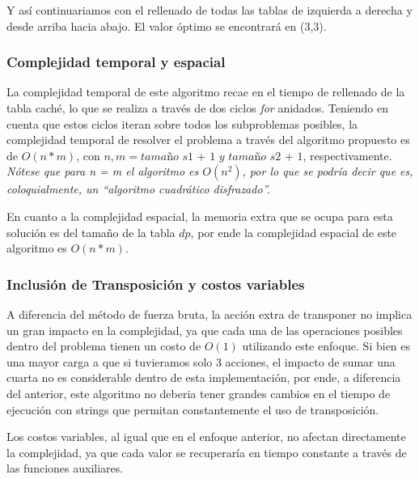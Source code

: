 Y así continuariamos con el rellenado de todas las tablas de izquierda a derecha y desde arriba hacia abajo. 
El valor óptimo se encontrará en (3,3).


\subsubsection{Complejidad temporal y espacial}
La complejidad temporal de este algoritmo recae en el tiempo de rellenado de la tabla caché, lo que se realiza a través de dos ciclos \textit{for} anidados.
Teniendo en cuenta que estos ciclos iteran sobre todos los subproblemas posibles, la complejidad temporal de resolver el problema 
a través del algoritmo propuesto es de $O(n*m)$, con $n,m = \textit{tamaño s1 + 1 y tamaño s2 + 1}$, respectivamente. 
\textit{Nótese que para n = m el algoritmo es $O(n^2)$, por lo que se podría decir que es, coloquialmente, un ``algoritmo cuadrático disfrazado''.}   

En cuanto a la complejidad espacial, la memoria extra que se ocupa para esta solución es del tamaño de la tabla $dp$, por ende la complejidad espacial de este algoritmo
es $O(n*m)$.


\subsubsection{Inclusión de Transposición y costos variables}
A diferencia del método de fuerza bruta, la acción extra de transponer no implica un gran impacto en la complejidad, ya que cada una de las operaciones posibles 
dentro del problema tienen un costo de $O(1)$ utilizando este enfoque. Si bien es una mayor carga a que si tuvieramos solo 3 acciones, el impacto de 
sumar una cuarta no es considerable dentro de esta implementación, por ende, a diferencia del anterior, este algoritmo no deberia tener grandes cambios en el tiempo de ejecución 
con strings que permitan constantemente el uso de transposición.

Los costos variables, al igual que en el enfoque anterior, no afectan directamente la complejidad, ya que cada valor se recuperaría en tiempo constante a través de las funciones 
auxiliares.